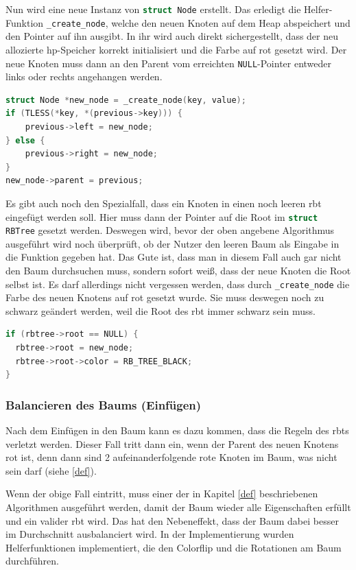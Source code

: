 \documentclass[11pt]{article}
\newcommand{\lstin}[1]{\lstinline[language=C]{#1}}
\begin{document}
Nun wird eine neue Instanz von \lstin{struct Node} erstellt. Das erledigt die Helfer-Funktion \lstin{_create_node}, welche den neuen Knoten auf dem Heap abspeichert und den Pointer auf ihn ausgibt.
In ihr wird auch direkt sichergestellt, dass der neu allozierte \gls{hp}-Speicher korrekt initialisiert und die Farbe auf rot gesetzt wird.
Der neue Knoten muss dann an den Parent vom erreichten \lstin{NULL}-Pointer entweder links oder rechts angehangen werden.

\begin{lstlisting}[language=C]
struct Node *new_node = _create_node(key, value);
if (TLESS(*key, *(previous->key))) {
    previous->left = new_node;
} else {
    previous->right = new_node;
}
new_node->parent = previous;
\end{lstlisting}

Es gibt auch noch den Spezialfall, dass ein Knoten in einen noch leeren \gls{rbt} eingefügt werden soll.
Hier muss dann der Pointer auf die Root im \lstin{struct RBTree} gesetzt werden. Deswegen wird, bevor der oben angebene Algorithmus ausgeführt wird noch überprüft,
ob der Nutzer den leeren Baum als Eingabe in die Funktion gegeben hat.
Das Gute ist, dass man in diesem Fall auch gar nicht den Baum durchsuchen muss, sondern sofort weiß, dass der neue Knoten die Root selbst ist.
Es darf allerdings nicht vergessen werden, dass durch \lstin{_create_node} die Farbe des neuen Knotens auf rot gesetzt wurde. Sie muss deswegen noch zu schwarz geändert werden,
weil die Root des \gls{rbt} immer schwarz sein muss.
\begin{lstlisting}[language=C]
if (rbtree->root == NULL) {
  rbtree->root = new_node;
  rbtree->root->color = RB_TREE_BLACK;
}
\end{lstlisting}

\subsubsection{Balancieren des Baums (Einfügen)}
Nach dem Einfügen in den Baum kann es dazu kommen, dass die Regeln des \glspl{rbt} verletzt werden.
Dieser Fall tritt dann ein, wenn der Parent des neuen Knotens rot ist, denn dann sind 2 aufeinanderfolgende rote Knoten im Baum, was nicht sein darf (siehe \ref{def}).

Wenn der obige Fall eintritt, muss einer der in Kapitel \ref{def} beschriebenen Algorithmen ausgeführt werden, damit der Baum wieder alle Eigenschaften erfüllt und ein valider \gls{rbt} wird.
Das hat den Nebeneffekt, dass der Baum dabei besser im Durchschnitt ausbalanciert wird.
In der Implementierung wurden Helferfunktionen implementiert, die den Colorflip und die Rotationen am Baum durchführen.
\end{document}
